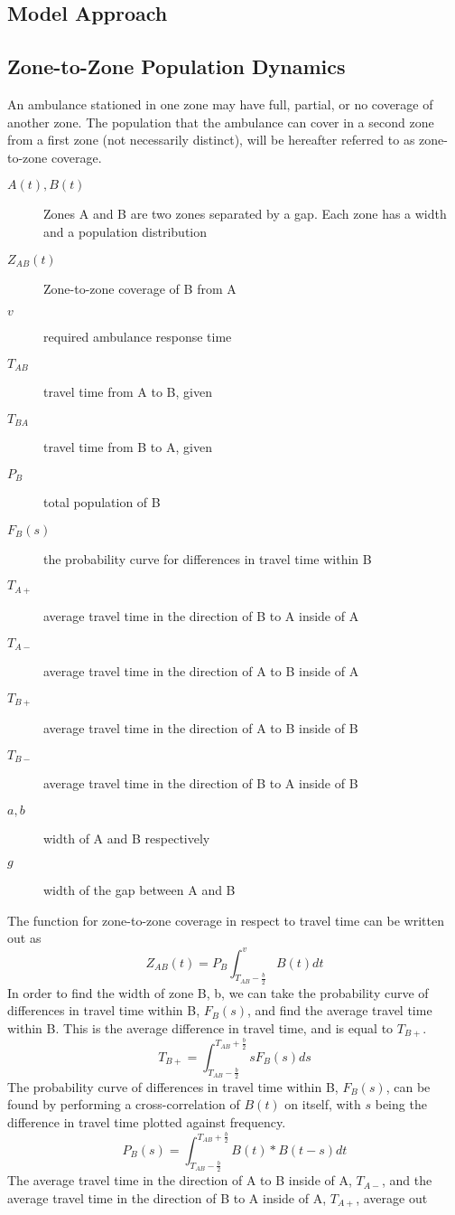 \documentclass[notitlepage, 12pt]{article}
\begin{document}
\subsection{Model Approach}

\subsection{Zone-to-Zone Population Dynamics}
An ambulance stationed in one zone may have full, partial, or no coverage of another zone. The population
that the ambulance can cover in a second zone from a first zone (not necessarily distinct), will be hereafter referred to as
zone-to-zone coverage.
\begin{description}
    \item[$A(t), B(t)$] Zones A and B are two zones separated by a gap. Each zone has a width and a population distribution
    \item[$Z_{AB}(t)$] Zone-to-zone coverage of  B from  A
    \item[$v$] required ambulance response time
    \item[$T_{AB}$] travel time from A to B, given
    \item[$T_{BA}$] travel time from B to A, given
    \item[$P_B$] total population of B
    \item[$F_B(s)$] the probability curve for differences in travel time within B
    \item[$T_{A+}$] average travel time in the direction of B to A inside of A
    \item[$T_{A-}$] average travel time in the direction of A to B inside of A
    \item[$T_{B+}$] average travel time in the direction of A to B inside of B
    \item[$T_{B-}$] average travel time in the direction of B to A inside of B
    \item[$a, b$] width of A and B respectively
    \item[$g$] width of the gap between A and B
\end{description}


The function for zone-to-zone coverage in respect to travel time can be written out as 
$$Z_{AB}(t) = P_B \int^v_{T_{AB} - \frac{b}{2}} B(t) dt$$
In order to find the width of zone B, b, we can take the probability curve of differences in travel time within B, $F_B(s)$, and find the average travel time within B. This is the average difference in travel time, and is equal to $T_{B+}$. 
$$T_{B+} = \int^{T_{AB} + \frac{b}{2}}_{T_{AB} - \frac{b}{2}} s F_B(s) ds$$
The probability curve of differences in travel time within B, $F_B(s)$, can be found by performing a cross-correlation of $B(t)$ on itself, with $s$ being the difference in travel time plotted against frequency.
$$P_B(s) =\int^{T_{AB} + \frac{b}{2}}_{T_{AB} - \frac{b}{2}} B(t) * B(t-s) dt$$
The average travel time in the direction of A to B inside of A, $T_{A-}$, and the average travel time in the direction of B to A inside of A, $T_{A+}$, average out 
\end{document}
